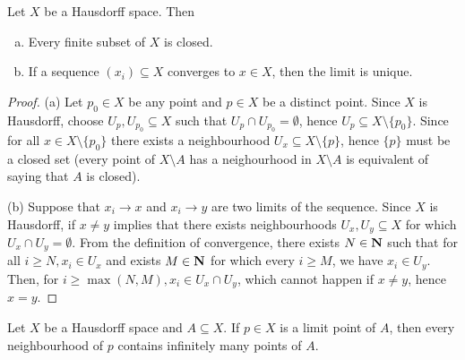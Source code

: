 \begin{proposition}
\label{prop: Hausdorff properties}
Let \(X\) be a Hausdorff space. Then
\begin{enumerate}[(a)]
  \item Every finite subset of \(X\) is closed.
  \item If a sequence \((x_i) \subseteq X\) converges to \(x \in X\), then the
    limit is unique.
\end{enumerate}
\end{proposition}

\begin{proof}
(a) Let \(p_0 \in X\) be any point and \(p \in X\) be a distinct point. Since
\(X\) is Hausdorff, choose \(U_p, U_{p_0} \subseteq X\) such that \(U_p \cap
U_{p_0} = \emptyset\), hence  \(U_p \subseteq X \setminus \{p_0\}\). Since for all
\(x \in X \setminus \{p_0\}\) there exists a neighbourhood \(U_x
\subseteq X \setminus \{p\}\), hence \(\{p\}\) must be a closed set (every
point of \(X \setminus A\) has a neighourhood in \(X \setminus A\) is
equivalent of saying that \(A\) is closed).

(b) Suppose that \(x_i \to x\) and \(x_i \to y\) are two limits of the
sequence. Since \(X\) is Hausdorff, if \(x \neq y\) implies that there exists
neighbourhoods \(U_x, U_y \subseteq X\) for which \(U_x \cap U_y =
\emptyset\). From the definition of convergence, there exists \(N \in
\mathbf{N}\) such that for all \(i \geq N, x_i \in U_x\) and exists \(M \in \mathbf{N}\)
for which every \(i \geq M\), we have \(x_i \in U_y\). Then, for \(i \geq
\max(N, M), x_i \in U_x \cap U_y\), which cannot happen if \(x \neq y\), hence
\(x = y\).
\end{proof}

\begin{proposition}
Let \(X\) be a Hausdorff space and \(A \subseteq X\). If \(p \in X\) is a
limit point of \(A\), then every neighbourhood of \(p\) contains infinitely
many points of \(A\).
\end{proposition}

